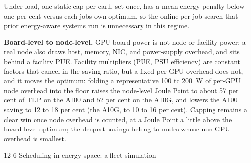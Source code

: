 \documentclass[3p,twocolumn]{elsarticle}
\makeatletter
\renewcommand\section{\@startsection{section}{1}{\z@}%
           {12\p@ \@plus 4\p@ \@minus 4\p@}%
           {6\p@ \@plus 4\p@ \@minus 3\p@}%
           {\normalsize\bfseries\boldmath}}
\makeatother
\begin{document}
Under load, one static cap per card, set once, has a mean energy penalty below one per cent versus each job\textquotesingle s own optimum, so the online per-job search that prior energy-aware systems run is unnecessary in this regime.

\textbf{Board-level to node-level.} GPU board power is not node or facility power: a real node also draws host, memory, NIC, and power-supply overhead, and sits behind a facility PUE. Facility multipliers (PUE, PSU efficiency) are constant factors that cancel in the saving ratio, but a fixed per-GPU overhead does not, and it moves the optimum: folding a representative 100 to 200~W of per-GPU node overhead into the floor raises the node-level Joule Point to about 57 per cent of TDP on the A100 and 52 per cent on the A10G, and lowers the A100 saving to 12 to 18 per cent (the A10G, to 10 to 16 per cent). Capping remains a clear win once node overhead is counted, at a Joule Point a little above the board-level optimum; the deepest savings belong to nodes whose non-GPU overhead is smallest.

\section{Scheduling in energy space: a fleet simulation}\label{scheduling-in-energy-space-a-fleet-simulation}
\end{document}
